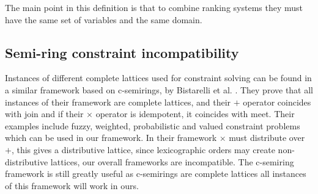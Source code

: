 The main point in this definition is that to combine ranking systems they must have the same set of variables 
and the same domain.

\subsection{Semi-ring constraint incompatibility}
Instances of different complete lattices used for constraint solving can be found in a similar framework based on c-semirings, 
by Bistarelli et al. \cite{Bistarelli1997}.
They prove that all instances of their framework are complete lattices, and their $+$ operator coincides with join
and if their $\times$ operator is idempotent, it coincides with meet.
Their examples include fuzzy, weighted, probabilistic and valued constraint problems which can be used in our framework.
In their framework $\times$ must distribute over $+$, this gives a distributive lattice,
since lexicographic orders may create non-distributive lattices, our overall frameworks are incompatible.
The c-semiring framework is still greatly useful as c-semirings are complete lattices all instances of this framework will work in ours.





